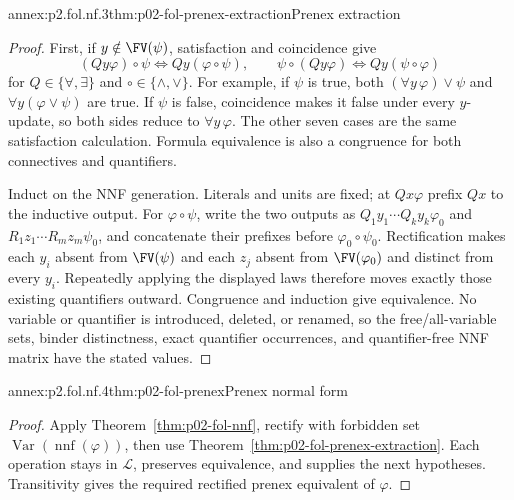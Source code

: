 \begin{annexitem}{annex:p2.fol.nf.3}{thm:p02-fol-prenex-extraction}{Prenex extraction}
\begin{proof}
First, if \(y\notin\FV(\psi)\), satisfaction and coincidence give
\[
 (Qy\varphi)\circ\psi\Leftrightarrow Qy(\varphi\circ\psi),
 \qquad
 \psi\circ(Qy\varphi)\Leftrightarrow Qy(\psi\circ\varphi)
\]
for \(Q\in\{\forall,\exists\}\) and
\(\circ\in\{\land,\lor\}\).  For example, if
\(\psi\) is true, both \((\forall y\,\varphi)\lor\psi\) and
\(\forall y(\varphi\lor\psi)\) are true.  If \(\psi\) is false,
coincidence makes it false under every \(y\)-update, so both sides reduce to
\(\forall y\,\varphi\).  The other seven cases are the same satisfaction
calculation.  Formula equivalence is also a
congruence for both connectives and quantifiers.

Induct on the NNF generation.  Literals and units are fixed; at \(Qx\varphi\)
prefix \(Qx\) to the inductive output.  For
\(\varphi\circ\psi\), write the two outputs as
\(Q_1y_1\cdots Q_ky_k\varphi_0\) and
\(R_1z_1\cdots R_mz_m\psi_0\), and concatenate their prefixes before
\(\varphi_0\circ\psi_0\).  Rectification makes each \(y_i\) absent from
\(\FV(\psi)\) and each \(z_j\) absent from
\(\FV(\varphi_0)\) and distinct from every \(y_i\).  Repeatedly applying the
displayed laws therefore moves exactly those existing quantifiers outward.
Congruence and induction give equivalence.  No variable or quantifier is
introduced, deleted, or renamed, so the free/all-variable sets, binder
distinctness, exact quantifier occurrences, and quantifier-free NNF matrix
have the stated values.
\end{proof}
\end{annexitem}

\begin{annexitem}{annex:p2.fol.nf.4}{thm:p02-fol-prenex}{Prenex normal form}
\begin{proof}
Apply Theorem~\ref{thm:p02-fol-nnf}, rectify with forbidden set
\(\operatorname{Var}(\operatorname{nnf}(\varphi))\), then use
Theorem~\ref{thm:p02-fol-prenex-extraction}.  Each operation stays in
\(\mathcal L\), preserves equivalence, and supplies the next hypotheses.
Transitivity gives the required rectified prenex equivalent of \(\varphi\).
\end{proof}
\end{annexitem}


